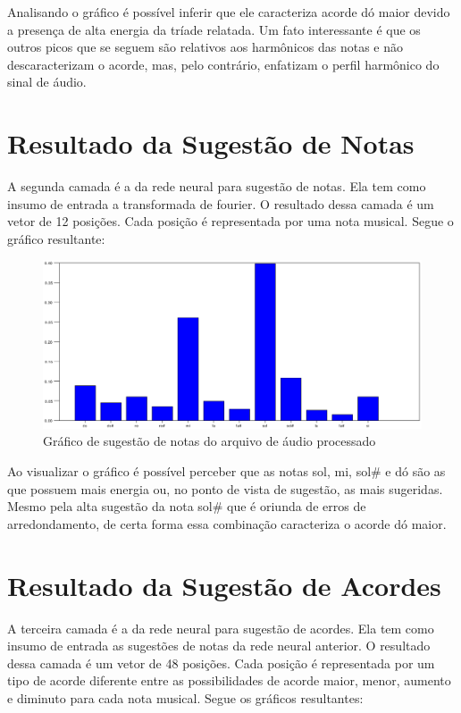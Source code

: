 Analisando o gráfico é possível inferir que ele caracteriza acorde dó maior devido a presença de alta energia da tríade relatada. Um fato interessante é que os outros picos que se seguem são relativos aos harmônicos das notas e não descaracterizam o acorde, mas, pelo contrário, enfatizam o perfil harmônico do sinal de áudio.

\section{Resultado da Sugestão de Notas}
\label{sec:resultadodasugestaodenotas}

A segunda camada é a da rede neural para sugestão de notas. Ela tem como insumo de entrada a transformada de fourier. O resultado dessa camada é um vetor de 12 posições. Cada posição é representada por uma nota musical. Segue o gráfico resultante: 

\begin{figure}[h]
	\centering
		\includegraphics[keepaspectratio=true,scale=0.49]{figuras/notas.eps}
	\caption{Gráfico de sugestão de notas do arquivo de áudio processado}
\end{figure}

Ao visualizar o gráfico é possível perceber que as notas sol, mi, sol\#
 e dó são as que possuem mais energia ou, no ponto de vista de sugestão, as mais sugeridas. Mesmo pela alta sugestão da nota sol\#
 que é oriunda de erros de arredondamento, de certa forma essa combinação caracteriza o acorde dó maior.   

\section{Resultado da Sugestão de Acordes}
\label{sec:resultadodasugestaodeacordes}

A terceira camada é a da rede neural para sugestão de acordes. Ela tem como insumo de entrada as sugestões de notas da rede neural anterior. O resultado dessa camada é um vetor de 48 posições. Cada posição é representada por um tipo de acorde diferente entre as possibilidades de acorde maior, menor, aumento e diminuto para cada nota musical. Segue os gráficos resultantes:


